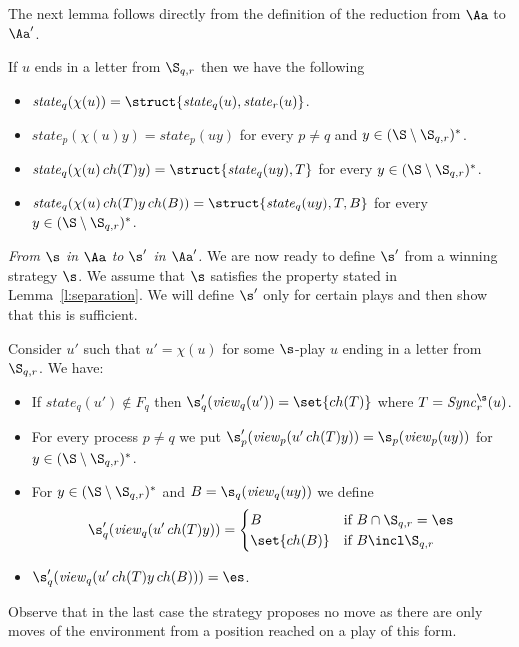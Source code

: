 \documentclass{llncs}
\newcommand{\Sync}{\mathit{Sync}}
\newcommand{\state}{\mathit{state}}
\newcommand{\view}{\mathit{view}}
\newcommand{\ch}{\mathop{ch}}
\begin{document}
The next lemma follows directly from the definition of the reduction
from $\Aa$ to $\Aa'$.

\medskip

\begin{lemma}\label{lemma:states}
  If $u$ ends in a letter from $\S_{q,r}$ then we have the following
  \begin{itemize}
  \item $\state_q(\chi(u))=\struct{\state_q(u),\state_r(u)}$.
  \item $\state_p(\chi(u)y)=\state_p(uy)$ for every $p\not=q$ and
    $y\in (\S \setminus \S_{q,r})^*$.
  \item $\state_q(\chi(u)\ch(T)y)=\struct{\state_q(uy),T}$ for every $y\in (\S \setminus \S_{q,r})^*$.
  \item $\state_q(\chi(u)\ch(T)y\ch(B))=\struct{\state_q(uy),T,B}$ for every $y\in (\S \setminus \S_{q,r})^*$.
  \end{itemize}
\end{lemma}


\medskip
\noindent\textit{From $\s$ in $\Aa$ to $\s'$ in $\Aa'$.}
We are now ready to define $\s'$ from a winning strategy $\s$. We
assume that $\s$ satisfies the property stated in
Lemma~\ref{l:separation}. We will define $\s'$ only for certain plays and
then show that this is sufficient. 

Consider $u'$ such that $u'=\chi(u)$ for some $\s$-play $u$ ending in
a letter from $\S_{q,r}$. We have:
\begin{itemize}
\item If $\state_q(u') \notin F_q$ then $\s'_q(\view_q(u'))=\set{\ch(T)}$
  where $T=\Sync^\s_r(u)$.
\item For every process $p\not=q$ we put
  $\s'_p(\view_p(u'\ch(T)y))=\s_p(\view_p(uy))$ for $y\in
  (\S \setminus \S_{q,r})^*$.
\item For $y\in (\S
  \setminus \S_{q,r})^*$ and $B=\s_q(\view_q(uy))$ we define
  \begin{equation*}
    \s'_q(\view_q(u'\ch(T)y))=
    \begin{cases}
      B & \text{if $B\cap \S_{q,r}=\es$} \\
      \set{\ch(B)} & \text{if $B\incl \S_{q,r}$}  
    \end{cases}
  \end{equation*}
\item $\s_q'(\view_q(u'\ch(T)y\ch(B)))=\es$.
\end{itemize}
Observe that in the last case the strategy proposes no move as there
are only moves of the environment from a position reached on a play of
this form.
\end{document}
